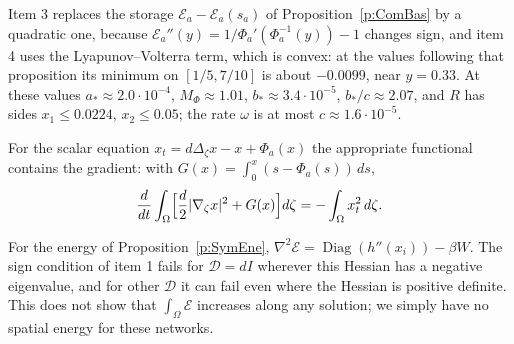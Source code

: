 Item 3 replaces the storage $\mathcal E_a-\mathcal E_a(s_a)$ of Proposition~\ref{p:ComBas} by a quadratic one, because $\mathcal E_a''(y)=1/\Phi_a'(\Phi_a^{-1}(y))-1$ changes sign, and item 4 uses the Lyapunov--Volterra term, which is convex: at the values following that proposition its minimum on $[1/5,7/10]$ is about $-0.0099$, near $y=0.33$. At these values $a_*\approx2.0\cdot10^{-4}$, $M_\Phi\approx1.01$, $b_*\approx3.4\cdot10^{-5}$, $b_*/c\approx2.07$, and $R$ has sides $x_1\le0.0224$, $x_2\le0.05$; the rate $\omega$ is at most $c\approx1.6\cdot10^{-5}$.

For the scalar equation $x_t=d\Delta_\zeta x-x+\Phi_a(x)$ the appropriate functional contains the gradient: with $G(x)=\int_0^x(s-\Phi_a(s))\,ds$,
\[
 \frac{d}{dt}\int_\Omega\Bigl[\frac d2|\nabla_\zeta x|^2+G(x)\Bigr]d\zeta=-\int_\Omega x_t^2\,d\zeta.
\]

For the energy of Proposition~\ref{p:SymEne}, $\nabla^2\mathcal E=\operatorname{Diag}(h''(x_i))-\beta W$. The sign condition of item 1 fails for $\mathcal D=dI$ wherever this Hessian has a negative eigenvalue, and for other $\mathcal D$ it can fail even where the Hessian is positive definite. This does not show that $\int_\Omega\mathcal E$ increases along any solution; we simply have no spatial energy for these networks.

